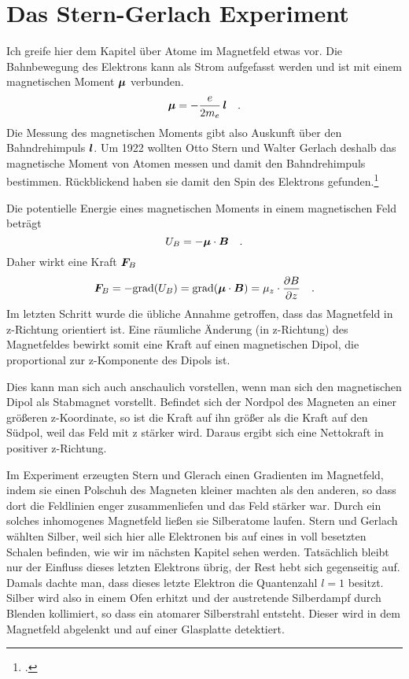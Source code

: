 \section{Das Stern-Gerlach Experiment}

Ich greife hier dem Kapitel über Atome im Magnetfeld etwas vor.
Die Bahnbewegung des Elektrons kann als Strom aufgefasst werden und ist mit einem magnetischen Moment $\boldsymbol{\mu}$ verbunden.
\begin{equation}
    \boldsymbol{\mu} = - \frac{e}{2 m_e} \,  \boldsymbol{l} \quad .
\end{equation}
Die Messung des magnetischen Moments gibt also Auskunft über den Bahndrehimpuls $\boldsymbol{l}$.
Um 1922 wollten Otto Stern und Walter Gerlach deshalb das magnetische Moment von Atomen messen und damit den Bahndrehimpuls bestimmen. Rückblickend haben sie damit den Spin des Elektrons gefunden.\footcite{SEP_Stern_gerlach}

Die potentielle Energie eines magnetischen Moments in einem magnetischen Feld beträgt
\begin{equation}
    U_B = - \boldsymbol{\mu} \cdot \boldsymbol{B} \quad .
\end{equation}
Daher wirkt eine Kraft $\boldsymbol{F}_B$
\begin{equation}
    \boldsymbol{F}_B = - \text{grad} ( U_B ) =  \text{grad} (\boldsymbol{\mu} \cdot \boldsymbol{B} ) = \mu_z \cdot \frac{\partial B}{\partial z} \quad .
\end{equation}
Im letzten Schritt wurde die übliche Annahme getroffen, dass das Magnetfeld in z-Richtung orientiert ist. Eine räumliche Änderung (in z-Richtung) des Magnetfeldes bewirkt somit eine Kraft auf einen magnetischen Dipol, die proportional zur z-Komponente des Dipols ist.

Dies kann man sich auch anschaulich vorstellen, wenn man sich den magnetischen Dipol als Stabmagnet vorstellt. Befindet sich der Nordpol des Magneten an einer größeren z-Koordinate, so ist die Kraft auf ihn größer als die Kraft auf den Südpol, weil das Feld mit z stärker wird. Daraus ergibt sich eine Nettokraft in positiver z-Richtung. 

Im Experiment erzeugten Stern und Glerach einen Gradienten im Magnetfeld, indem sie einen Polschuh des Magneten kleiner machten als den anderen, so dass dort die Feldlinien enger zusammenliefen und das Feld stärker war. Durch ein solches inhomogenes Magnetfeld ließen sie  Silberatome laufen. 
Stern und Gerlach wählten Silber, weil sich hier alle Elektronen bis auf eines in voll besetzten Schalen befinden, wie wir im nächsten Kapitel sehen werden. Tatsächlich bleibt nur der Einfluss dieses letzten Elektrons übrig, der Rest hebt sich gegenseitig auf. Damals dachte man, dass dieses letzte Elektron die Quantenzahl $l=1$ besitzt.
 Silber wird also in einem Ofen erhitzt und der austretende Silberdampf durch Blenden kollimiert, so dass ein atomarer Silberstrahl entsteht. Dieser wird in dem Magnetfeld abgelenkt und auf einer Glasplatte detektiert.

